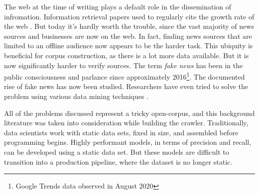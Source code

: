 The web at the time of writing plays a default role in the dissemination of infromation.
Information retrieval papers used to regularly cite the growth rate of the
web \cite{mcbryan1994, page1998}. But today it's hardly worth the
trouble, since the vast majority of news sources and businesses are now on the
web.  In fact, finding news sources that are limited to an offline
audience now appears to be the harder task.  This ubiquity
is beneficial for corpus construction, as there is a lot more
data available.  But it is now significantly harder to verify
sources.  The term {\it fake news} has been in the public consciousness
and parlance since approximately 2016\footnote{Google
Trends data observed in August 2020}.  The documented rise of
fake news has now been studied.  Researchers have even
tried to solve the problem using various data mining
techniques \cite{shu2017}.

All of the problems discussed represent a tricky open-corpus,
and this background literature was taken into consideration
while building the crawler.  Traditionally, data scientists work
with static data sets, fixed in size, and assembled before
programming begins.  Highly performant models, in terms of
precision and recall, can be developed using a static data
set.  But these models are difficult to transition into a
production pipeline, where the dataset is no longer static.